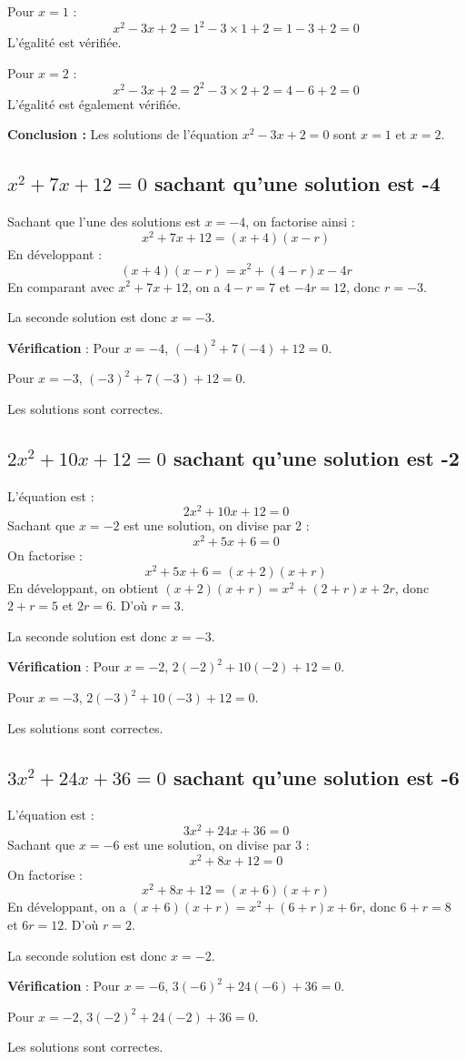 \documentclass[a4paper,12pt]{article}
\begin{document}
Pour \( x = 1 \) :
\[
x^2 - 3x + 2 = 1^2 - 3 \times 1 + 2 = 1 - 3 + 2 = 0
\]
L'égalité est vérifiée.

Pour \( x = 2 \) :
\[
x^2 - 3x + 2 = 2^2 - 3 \times 2 + 2 = 4 - 6 + 2 = 0
\]
L'égalité est également vérifiée.

\textbf{Conclusion :} Les solutions de l'équation \( x^2 - 3x + 2 = 0 \) sont \( x = 1 \) et \( x = 2 \).

\subsection*{\(x^2 + 7x + 12 = 0\) sachant qu'une solution est -4}

Sachant que l'une des solutions est \( x = -4 \), on factorise ainsi :
\[
x^2 + 7x + 12 = (x + 4)(x - r)
\]
En développant :
\[
(x + 4)(x - r) = x^2 + (4 - r)x - 4r
\]
En comparant avec \( x^2 + 7x + 12 \), on a \( 4 - r = 7 \) et \( -4r = 12 \), donc \( r = -3 \).

La seconde solution est donc \( x = -3 \).

\textbf{Vérification} : 
Pour \( x = -4 \), \( (-4)^2 + 7(-4) + 12 = 0 \).

Pour \( x = -3 \), \( (-3)^2 + 7(-3) + 12 = 0 \).

Les solutions sont correctes.

\subsection*{\(2x^2 + 10x + 12 = 0\) sachant qu'une solution est -2}

L'équation est :
\[
2x^2 + 10x + 12 = 0
\]
Sachant que \( x = -2 \) est une solution, on divise par 2 :
\[
x^2 + 5x + 6 = 0
\]
On factorise :
\[
x^2 + 5x + 6 = (x + 2)(x + r)
\]
En développant, on obtient \( (x + 2)(x + r) = x^2 + (2 + r)x + 2r \), donc \( 2 + r = 5 \) et \( 2r = 6 \). D'où \( r = 3 \).

La seconde solution est donc \( x = -3 \).

\textbf{Vérification} : 
Pour \( x = -2 \), \( 2(-2)^2 + 10(-2) + 12 = 0 \).

Pour \( x = -3 \), \( 2(-3)^2 + 10(-3) + 12 = 0 \).

Les solutions sont correctes.

\subsection*{\(3x^2 + 24x + 36 = 0\) sachant qu'une solution est -6}

L'équation est :
\[
3x^2 + 24x + 36 = 0
\]
Sachant que \( x = -6 \) est une solution, on divise par 3 :
\[
x^2 + 8x + 12 = 0
\]
On factorise :
\[
x^2 + 8x + 12 = (x + 6)(x + r)
\]
En développant, on a \( (x + 6)(x + r) = x^2 + (6 + r)x + 6r \), donc \( 6 + r = 8 \) et \( 6r = 12 \). D'où \( r = 2 \).

La seconde solution est donc \( x = -2 \).

\textbf{Vérification} : 
Pour \( x = -6 \), \( 3(-6)^2 + 24(-6) + 36 = 0 \).

Pour \( x = -2 \), \( 3(-2)^2 + 24(-2) + 36 = 0 \).

Les solutions sont correctes.

  
\end{document}
